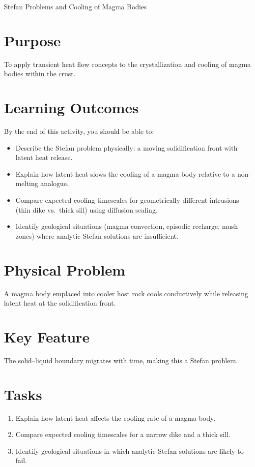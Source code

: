 \begin{activity}{Stefan Problems and Cooling of Magma Bodies}

\section*{Purpose}
To apply transient heat flow concepts to the crystallization and cooling of magma bodies within the crust.

{\color{red}
\section*{Learning Outcomes}

By the end of this activity, you should be able to:
\begin{itemize}
  \item Describe the Stefan problem physically: a moving solidification front with latent heat release.
  \item Explain how latent heat slows the cooling of a magma body relative to a non-melting analogue.
  \item Compare expected cooling timescales for geometrically different intrusions (thin dike vs.\ thick sill) using diffusion scaling.
  \item Identify geological situations (magma convection, episodic recharge, mush zones) where analytic Stefan solutions are insufficient.
\end{itemize}
}

\section*{Physical Problem}
A magma body emplaced into cooler host rock cools conductively while releasing
latent heat at the solidification front.

\section*{Key Feature}
The solid--liquid boundary migrates with time, making this a Stefan problem.

\section*{Tasks}
\begin{enumerate}
  \item Explain how latent heat affects the cooling rate of a magma body.
  \answerbox[3cm]
  \item Compare expected cooling timescales for a narrow dike and a thick sill.
  \answerbox[3cm]
  \item Identify geological situations in which analytic Stefan solutions are
  likely to fail.
  \answerbox[3cm]
\end{enumerate}


\end{activity}
